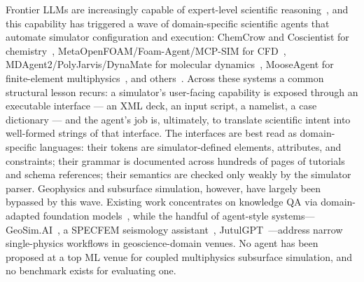 \documentclass{article}
\begin{document}
Frontier LLMs are increasingly capable of expert-level scientific reasoning~\citep{rein2023gpqa,phan2025hle}, and this capability has triggered a wave of domain-specific scientific agents that automate simulator configuration and execution: ChemCrow and Coscientist for chemistry~\citep{bran2024chemcrow,boiko2023coscientist}, MetaOpenFOAM/Foam-Agent/MCP-SIM for CFD~\citep{chen2024metaopenfoam,yue2025foamagent,mcpsim2026}, MDAgent2/PolyJarvis/DynaMate for molecular dynamics~\citep{shi2026mdagent2,zhao2026polyjarvis,guilbert2025dynamate}, MooseAgent for finite-element multiphysics~\citep{zhan2025mooseagent}, and others~\citep{liu2024asa,luo2025llm4sr}. Across these systems a common structural lesson recurs: a simulator's user-facing capability is exposed through an executable interface --- an XML deck, an input script, a namelist, a case dictionary --- and the agent's job is, ultimately, to translate scientific intent into well-formed strings of that interface. The interfaces are best read as domain-specific languages: their tokens are simulator-defined elements, attributes, and constraints; their grammar is documented across hundreds of pages of tutorials and schema references; their semantics are checked only weakly by the simulator parser. Geophysics and subsurface simulation, however, have largely been bypassed by this wave. Existing work concentrates on knowledge QA via domain-adapted foundation models~\citep{deng2023k2,lin2024geogalactica}, while the handful of agent-style systems---GeoSim.AI~\citep{bekele2025geosim}, a SPECFEM seismology assistant~\citep{li2025seismologyagent}, JutulGPT~\citep{moyner2026jutulgpt}---address narrow single-physics workflows in geoscience-domain venues. No agent has been proposed at a top ML venue for coupled multiphysics subsurface simulation, and no benchmark exists for evaluating one.
\end{document}
